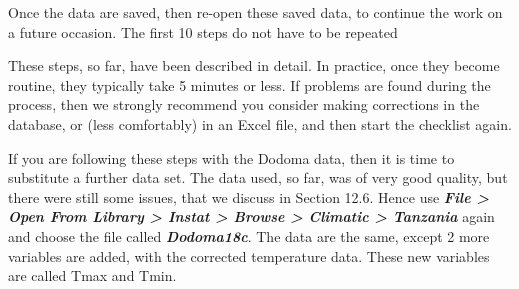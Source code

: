 \documentclass[
  letterpaper,
  DIV=11,
  numbers=noendperiod]{scrreprt}
\begin{document}
Once the data are saved, then re-open these saved data, to continue the
work on a future occasion. The first 10 steps do not have to be repeated

These steps, so far, have been described in detail. In practice, once
they become routine, they typically take 5 minutes or less. If problems
are found during the process, then we strongly recommend you consider
making corrections in the database, or (less comfortably) in an Excel
file, and then start the checklist again.

If you are following these steps with the Dodoma data, then it is time
to substitute a further data set. The data used, so far, was of very
good quality, but there were still some issues, that we discuss in
Section 12.6. Hence use \textbf{\emph{File \textgreater{} Open From
Library \textgreater{} Instat \textgreater{} Browse \textgreater{}
Climatic \textgreater{} Tanzania}} again and choose the file called
\textbf{\emph{Dodoma18c}}. The data are the same, except 2 more
variables are added, with the corrected temperature data. These new
variables are called Tmax and Tmin.
\end{document}
